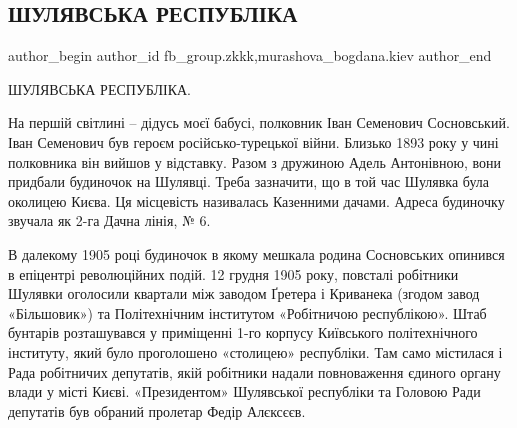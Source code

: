  
 
 
 
 
 
\subsection{ШУЛЯВСЬКА РЕСПУБЛІКА}
\label{sec:19_09_2019.fb.fb_group.zkkk.1.shuljavska_respublika}
 
\ifcmt
 author_begin
   author_id fb_group.zkkk,murashova_bogdana.kiev
 author_end
\fi

ШУЛЯВСЬКА РЕСПУБЛІКА.

На першій світлині – дідусь моєї бабусі, полковник Іван Семенович Сосновський.
Іван Семенович був героєм російсько-турецької війни. Близько 1893 року у чині
полковника він вийшов у відставку. Разом з дружиною Адель Антонівною, вони
придбали будиночок на Шулявці. Треба зазначити, що в той час Шулявка була
околицею Києва. Ця місцевість називалась Казенними дачами. Адреса будиночку
звучала як 2-га Дачна лінія, № 6.

\begin{multicols}{2}
\end{multicols}

В далекому 1905 році будиночок в якому мешкала родина Сосновських опинився в
епіцентрі революційних подій. 12 грудня 1905 року, повсталі робітники Шулявки
оголосили квартали між заводом Ґретера і Криванека (згодом завод «Більшовик»)
та Політехнічним інститутом «Робітничою республікою». Штаб бунтарів
розташувався у приміщенні 1-го корпусу Київського політехнічного інституту,
який було проголошено «столицею» республіки. Там само містилася і Рада
робітничих депутатів, якій робітники надали повноваження єдиного органу влади у
місті Києві. «Президентом» Шулявської республіки та Головою Ради депутатів був
обраний пролетар Федір Алєксєєв. 

